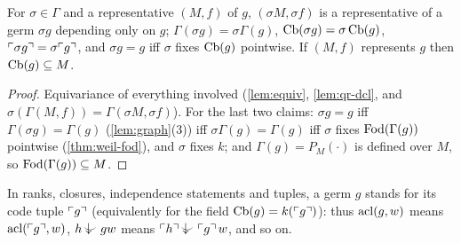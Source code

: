 \begin{lemma}\label{lem:germ-aut}
For $\sigma\in\Gamma$ and a representative $(M,f)$ of $g$, $(\sigma M,\sigma f)$ is a
representative of a germ $\sigma g$ depending only on $g$; $\Gamma(\sigma g)=\sigma\Gamma(g)$,
$\operatorname{Cb}(\sigma g)=\sigma\operatorname{Cb}(g)$, $\ulcorner \sigma g\urcorner=\sigma\ulcorner g\urcorner$, and $\sigma g=g$ iff
$\sigma$ fixes $\operatorname{Cb}(g)$ pointwise.  If $(M,f)$ represents $g$ then $\operatorname{Cb}(g)\subseteq M$.
\end{lemma}
\begin{proof}
Equivariance of everything involved (\cref{lem:equiv}, \cref{lem:qr-dcl}, and
$\sigma(\Gamma(M,f))=\Gamma(\sigma M,\sigma f)$).  For the last two claims:
$\sigma g=g$ iff $\Gamma(\sigma g)=\Gamma(g)$ (\cref{lem:graph}(3)) iff
$\sigma\Gamma(g)=\Gamma(g)$ iff $\sigma$ fixes $\operatorname{Fod}(\Gamma(g))$ pointwise
(\cref{thm:weil-fod}), and $\sigma$ fixes $k$; and $\Gamma(g)=P_M(\cdot)$ is defined
over $M$, so $\operatorname{Fod}(\Gamma(g))\subseteq M$.
\end{proof}

\begin{convention}\label{conv:germ-tuple}
In ranks, closures, independence statements and tuples, a germ $g$ stands for its code
tuple $\ulcorner g\urcorner$ (equivalently for the field $\operatorname{Cb}(g)=k(\ulcorner g\urcorner)$): thus $\operatorname{acl}(g,w)$ means
$\operatorname{acl}(\ulcorner g\urcorner,w)$, $h\ind{}gw$ means $\code h\ind{}\code g\,w$, and so on.
\end{convention}

